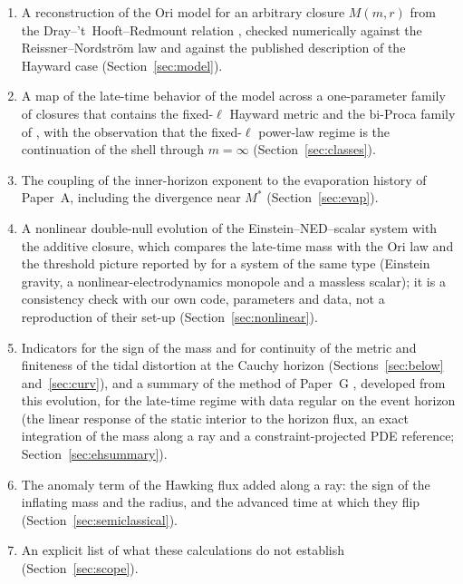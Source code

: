 \documentclass[11pt]{article}
\begin{document}
\begin{enumerate}
\item A reconstruction of the Ori model for an arbitrary closure $M(m,r)$ from the Dray--'t~Hooft--Redmount relation \citep{DrayTHooft1985,Redmount1985}, checked numerically against the Reissner--Nordstr\"om law and against the published description of the Hayward case (Section~\ref{sec:model}).
\item A map of the late-time behavior of the model across a one-parameter family of closures that contains the fixed-$\ell$ Hayward metric and the bi-Proca family of \citet{EichhornFernandes2025}, with the observation that the fixed-$\ell$ power-law regime is the continuation of the shell through $m=\infty$ (Section~\ref{sec:classes}).
\item The coupling of the inner-horizon exponent to the evaporation history of Paper~A, including the divergence near $M^*$ (Section~\ref{sec:evap}).
\item A nonlinear double-null evolution of the Einstein--NED--scalar system with the additive closure, which compares the late-time mass with the Ori law and the threshold picture reported by \citet{ShaoEtAl2025} for a system of the same type (Einstein gravity, a nonlinear-electrodynamics monopole and a massless scalar); it is a consistency check with our own code, parameters and data, not a reproduction of their set-up (Section~\ref{sec:nonlinear}).
\item Indicators for the sign of the mass and for continuity of the metric and finiteness of the tidal distortion at the Cauchy horizon (Sections~\ref{sec:below} and~\ref{sec:curv}), and a summary of the method of Paper~G \citep{PaperG}, developed from this evolution, for the late-time regime with data regular on the event horizon (the linear response of the static interior to the horizon flux, an exact integration of the mass along a ray and a constraint-projected PDE reference; Section~\ref{sec:ehsummary}).
\item The anomaly term of the Hawking flux added along a ray: the sign of the inflating mass and the radius, and the advanced time at which they flip (Section~\ref{sec:semiclassical}).
\item An explicit list of what these calculations do not establish (Section~\ref{sec:scope}).
\end{enumerate}
\end{document}
